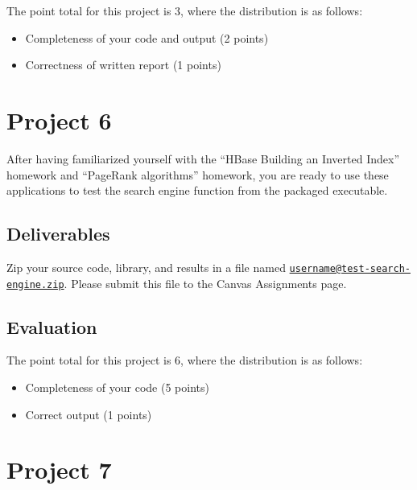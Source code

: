 The point total for this project is 3, where the distribution is as
follows:

\begin{itemize}
\tightlist
\item
  Completeness of your code and output (2 points)
\item
  Correctness of written report (1 points)
\end{itemize}



\chapter{Project 6}\label{project-6}

After having familiarized yourself with the ``HBase Building an Inverted
Index'' homework and ``PageRank algorithms'' homework, you are ready to
use these applications to test the search engine function from the
packaged executable.

\section{Deliverables}\label{deliverables}

Zip your source code, library, and results in a file named
\href{mailto:username@test-search-engine.zip}{\nolinkurl{username@test-search-engine.zip}}.
Please submit this file to the Canvas Assignments page.

\section{Evaluation}\label{evaluation}

The point total for this project is 6, where the distribution is as
follows:

\begin{itemize}
\tightlist
\item
  Completeness of your code (5 points)
\item
  Correct output (1 points)
\end{itemize}



\chapter{Project 7}\label{project-7}

